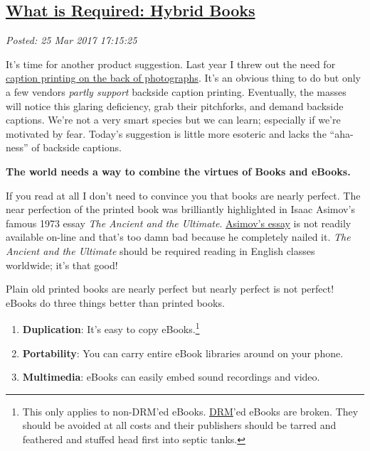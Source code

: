%

\subsection*{\href{http://analyzethedatanotthedrivel.org/2017/03/25/what-is-required-hybrid-books/}{What is Required: Hybrid Books}}


\noindent\emph{Posted: 25 Mar 2017 17:15:25}
\vspace{6pt}

It's time for another product suggestion. Last year I threw out the need
for
\href{https://analyzethedatanotthedrivel.org/2015/09/07/what-is-required-print-captions-on-the-back-of-photographs/}{caption
printing on the back of photographs}. It's an obvious thing to do but
only a few vendors \emph{partly support} backside caption printing.
Eventually, the masses will notice this glaring deficiency, grab their
pitchforks, and demand backside captions. We're not a very smart species
but we can learn; especially if we're motivated by fear. Today's
suggestion is little more esoteric and lacks the ``aha-ness'' of
backside captions.

\medskip
\textbf{The world needs a way to combine the virtues of Books and
eBooks.}
\medskip

If you read at all I don't need to convince you that books are nearly
perfect. The near perfection of the printed book was brilliantly
highlighted in Isaac Asimov's famous 1973 essay \emph{The Ancient and
the Ultimate}.
\href{https://www.jstor.org/stable/40009789?seq=1\#page_scan_tab_contents}{Asimov's
essay} is not readily available on-line and that's too damn bad because
he completely nailed it. \emph{The Ancient and the Ultimate} should be
required reading in English classes worldwide; it's that good!

Plain old printed books are nearly perfect but nearly perfect is not
perfect! eBooks do three things better than printed books.

\begin{enumerate}
\def\labelenumi{\arabic{enumi}.}
\item
  \textbf{Duplication}: It's easy to copy
  eBooks.\footnote{This only applies to non-DRM'ed eBooks.
  \href{https://en.wikipedia.org/wiki/Digital_rights_management}{DRM}'ed
  eBooks are broken. They should be avoided at all costs and their
  publishers should be tarred and feathered and stuffed head first into
  septic tanks.}\ %
\item
  \textbf{Portability}: You can carry entire eBook libraries around on
  your phone.
\item
  \textbf{Multimedia}: eBooks can easily embed sound recordings and
  video.
\end{enumerate}


